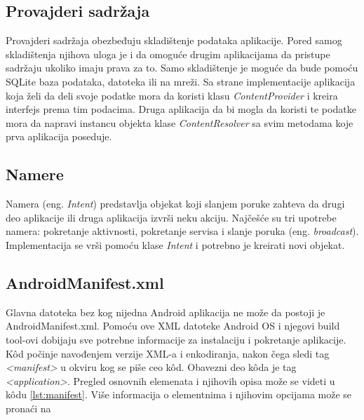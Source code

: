 \documentclass[android.tex]{subfiles}
\begin{document}
\subsection{Provajderi sadržaja}
Provajderi sadržaja obezbeđuju skladištenje podataka aplikacije. Pored samog skladištenja njihova uloga je i da omoguće drugim aplikacijama da pristupe sadržaju ukoliko imaju prava za to. Samo skladištenje je moguće da bude pomoću SQLite baza podataka, datoteka ili na mreži. Sa strane implementacije aplikacija koja želi da deli svoje podatke mora da koristi klasu \textit{ContentProvider} i kreira interfejs prema tim podacima. Druga aplikacija da bi mogla da  koristi te podatke mora da napravi instancu objekta klase \textit{ContentResolver} sa svim metodama koje prva aplikacija poseduje. 

\subsection{Namere}
\label{sec:namere}
Namera (eng. \textit{Intent}) predstavlja objekat koji slanjem poruke zahteva da drugi deo aplikacije ili druga aplikacija izvrši neku akciju. Najčešće su tri upotrebe namera: pokretanje aktivnosti, pokretanje servisa i slanje poruka (eng. \textit{broadcast}). Implementacija se vrši pomoću klase \textit{Intent }i potrebno je kreirati novi objekat. \cite{sajt:androidDevelopers}

\subsection{AndroidManifest.xml}
\label{sec:manifest}
Glavna datoteka bez kog nijedna Android aplikacija ne može da postoji je AndroidManifest.xml. Pomoću ove XML datoteke  Android OS i njegovi build tool-ovi dobijaju sve potrebne informacije za instalaciju i pokretanje aplikacije. K\^{o}d počinje navođenjem verzije XML-a i enkodiranja, nakon čega sledi tag \textit{<manifest> }u okviru kog se piše ceo k\^{o}d. Obavezni deo k\^{o}da je tag \textit{<application>}. Pregled osnovnih elemenata i njihovih opisa može se videti u k\^{o}du \ref{lst:manifest}. Više informacija o elementnima i njihovim opcijama može se pronaći na \cite{sajt:manifest}


\end{document}
